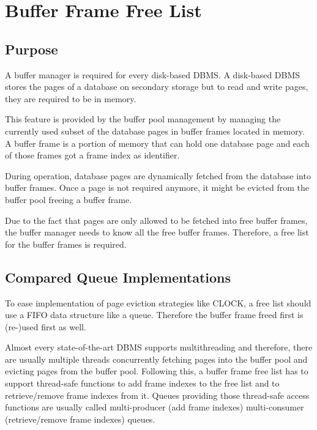 \chapter[Buffer Frame Free List]{Buffer Frame Free List} \label{ch:free-list}

\section[Purpose]{Purpose}

	A buffer manager is required for every disk-based DBMS. A disk-based DBMS stores the pages of a database on secondary storage but to read and write pages, they are required to be in memory.
	
	This feature is provided by the buffer pool management by managing the currently used subset of the database pages in buffer frames located in memory. A buffer frame is a portion of memory that can hold one database page and each of those frames got a frame index as identifier.
	
	During operation, database pages are dynamically fetched from the database into buffer frames. Once a page is not required anymore, it might be evicted from the buffer pool freeing a buffer frame.
	
	Due to the fact that pages are only allowed to be fetched into free buffer frames, the buffer manager needs to know all the free buffer frames. Therefore, a free list for the buffer frames is required.

\section[Compared Queue Implementations]{Compared Queue Implementations}

	To ease implementation of page eviction strategies like CLOCK, a free list should use a FIFO data structure like a queue. Therefore the buffer frame freed first is (re-)used first as well.
	
	Almost every state-of-the-art DBMS supports multithreading and therefore, there are usually multiple threads concurrently fetching pages into the buffer pool and evicting pages from the buffer pool. Following this, a buffer frame free list has to support thread-safe functions to add frame indexes to the free list and to retrieve/remove frame indexes from it. Queues providing those thread-safe access functions are usually called multi-producer (add frame indexes) multi-consumer (retrieve/remove frame indexes) queues.
	
